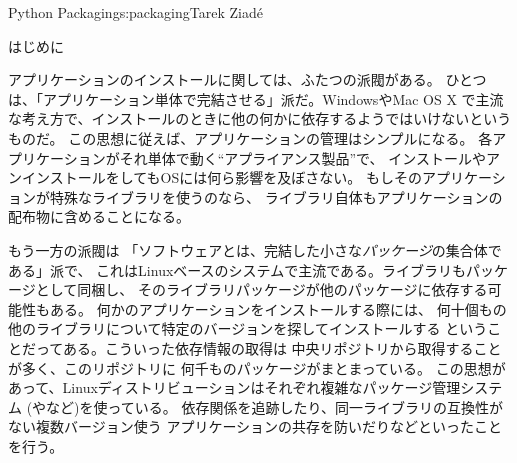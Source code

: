 \begin{aosachapter}{Python Packaging}{s:packaging}{Tarek Ziad\'{e}}

\begin{aosasect1}{はじめに}

アプリケーションのインストールに関しては、ふたつの派閥がある。
ひとつは、「アプリケーション単体で完結させる」派だ。WindowsやMac OS X
で主流な考え方で、インストールのときに他の何かに依存するようではいけないというものだ。
この思想に従えば、アプリケーションの管理はシンプルになる。
各アプリケーションがそれ単体で動く``アプライアンス製品''で、
インストールやアンインストールをしてもOSには何ら影響を及ぼさない。
もしそのアプリケーションが特殊なライブラリを使うのなら、
ライブラリ自体もアプリケーションの配布物に含めることになる。

もう一方の派閥は
「ソフトウェアとは、完結した小さな\emph{パッケージ}の集合体である」派で、
これはLinuxベースのシステムで主流である。ライブラリもパッケージとして同梱し、
そのライブラリパッケージが他のパッケージに依存する可能性もある。
何かのアプリケーションをインストールする際には、
何十個もの他のライブラリについて特定のバージョンを探してインストールする
ということだってある。こういった依存情報の取得は
中央リポジトリから取得することが多く、このリポジトリに
何千ものパッケージがまとまっている。
この思想があって、Linuxディストリビューションはそれぞれ複雑なパッケージ管理システム
(やなど)を使っている。
依存関係を追跡したり、同一ライブラリの互換性がない複数バージョン使う
アプリケーションの共存を防いだりなどといったことを行う。


\end{aosasect1}
\end{aosachapter}
